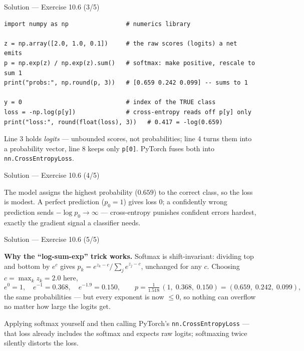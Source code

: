\documentclass[aspectratio=169,11pt]{beamer}
\begin{document}
\begin{frame}[fragile]{Solution --- Exercise 10.6 (3/5)}
\begin{solutionbox}
\begin{lstlisting}
import numpy as np                # numerics library

z = np.array([2.0, 1.0, 0.1])     # the raw scores (logits) a net emits
p = np.exp(z) / np.exp(z).sum()   # softmax: make positive, rescale to sum 1
print("probs:", np.round(p, 3))   # [0.659 0.242 0.099] -- sums to 1

y = 0                             # index of the TRUE class
loss = -np.log(p[y])              # cross-entropy reads off p[y] only
print("loss:", round(float(loss), 3))   # 0.417 = -log(0.659)
\end{lstlisting}
\end{solutionbox}
\begin{readme}{\scriptsize
  Line 3 holds \emph{logits} --- unbounded scores, not probabilities; line 4 turns them
  into a probability vector, line 8 keeps only \texttt{p[0]}. PyTorch fuses both into
  \texttt{nn.CrossEntropyLoss}.}
\end{readme}
\end{frame}

\begin{frame}{Solution --- Exercise 10.6 (4/5)}
\begin{solutionbox}
  The model assigns the highest probability ($0.659$) to the correct
  class, so the loss is modest. A perfect prediction ($p_0 = 1$)
  gives loss $0$; a confidently wrong prediction sends
  $-\log p_0 \to \infty$ --- cross-entropy punishes confident errors
  hardest, exactly the gradient signal a classifier needs.
\end{solutionbox}
\end{frame}

\begin{frame}{Solution --- Exercise 10.6 (5/5)}
\begin{solutionbox}
  \medskip
  \textbf{Why the ``log-sum-exp'' trick works.} Softmax is shift-invariant:
  dividing top and bottom by $e^{c}$ gives $p_k = e^{z_k - c}/\sum_j e^{z_j - c}$,
  unchanged for any $c$. Choosing $c = \max_k z_k = 2.0$ here,
  \[
    e^{0} = 1,\quad e^{-1} = 0.368,\quad e^{-1.9} = 0.150,\qquad
    p = \tfrac{1}{1.518}\,(1,\; 0.368,\; 0.150) = (0.659,\; 0.242,\; 0.099),
  \]
  the same probabilities --- but every exponent is now $\le 0$, so nothing
  can overflow no matter how large the logits get.

\end{solutionbox}
\begin{mistake}
  Applying softmax yourself and then calling PyTorch's
  \texttt{nn.CrossEntropyLoss} --- that loss already includes the softmax and
  expects raw logits; softmaxing twice silently distorts the loss.
\end{mistake}
\end{frame}
\end{document}
